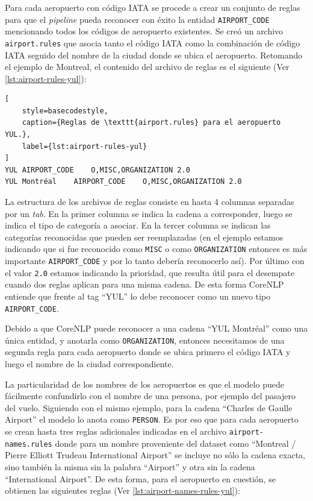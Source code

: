Para cada aeropuerto con código IATA se procede a crear un conjunto de reglas para que el \textit{pipeline} pueda
reconocer con éxito la entidad \texttt{AIRPORT\_CODE} mencionando todos los códigos de aeropuerto existentes.
Se creó un archivo \texttt{airport.rules} que asocia tanto el código IATA como la combinación de código IATA seguido del
nombre de la ciudad donde se ubica el aeropuerto.
Retomando el ejemplo de Montreal, el contenido del archivo de reglas es el siguiente
(Ver \autoref{lst:airport-rules-yul}):
\pagebreak

\begin{lstlisting}[
    style=basecodestyle,
    caption={Reglas de \texttt{airport.rules} para el aeropuerto YUL.},
    label={lst:airport-rules-yul}
]
YUL	AIRPORT_CODE	O,MISC,ORGANIZATION	2.0
YUL Montréal	AIRPORT_CODE	O,MISC,ORGANIZATION	2.0
\end{lstlisting}

La estructura de los archivos de reglas consiste en hasta 4 columnas separadas por un \textit{tab}.
En la primer columna se indica la cadena a corresponder, luego se indica  el tipo de categoría a asociar.
En la tercer columna se indican las categorías reconocidas que pueden ser reemplazadas (en el ejemplo estamos indicando
que si fue reconocido como \texttt{MISC} o como \texttt{ORGANIZATION} entonces es más importante \texttt{AIRPORT\_CODE}
y por lo tanto debería reconocerlo así).
Por último con el valor \texttt{2.0} estamos indicando la prioridad, que resulta útil para el desempate cuando dos
reglas aplican para una misma cadena.
De esta forma CoreNLP entiende que frente al tag ``YUL'' lo debe reconocer como un nuevo tipo \texttt{AIRPORT\_CODE}.

Debido a que CoreNLP puede reconocer a una cadena ``YUL Montréal'' como una única entidad, y anotarla como
\texttt{ORGANIZATION}, entonces necesitamos de una segunda regla para cada aeropuerto donde se ubica primero el código
IATA y luego el nombre de la ciudad correspondiente.

La particularidad de los nombres de los aeropuertos es que el modelo puede fácilmente confundirlo con el nombre de una
persona, por ejemplo del pasajero del vuelo.
Siguiendo con el mismo ejemplo, para la cadena ``Charles de Gaulle Airport'' el modelo lo anota como \texttt{PERSON}.
Es por eso que para cada aeropuerto se crean hasta tres reglas adicionales indicadas en el archivo
\texttt{airport-names.rules} donde para un nombre proveniente del dataset como ``Montreal / Pierre Elliott Trudeau
International Airport'' se incluye no sólo la cadena exacta, sino también la misma sin la palabra ``Airport'' y otra sin
la cadena ``International Airport''.
De esta forma, para el aeropuerto en cuestión, se obtienen las siguientes reglas
(Ver \autoref{lst:airport-names-rules-yul}):


